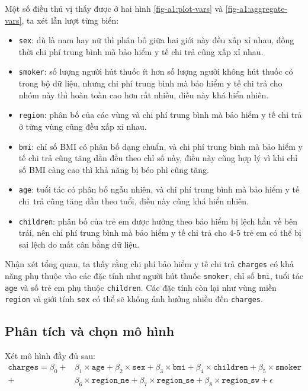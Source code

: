 Một số điều thú vị thấy được ở hai hình \ref{fig-a1:plot-vars} và \ref{fig-a1:aggregate-vars}, ta xét lần lượt từng biến:
\begin{itemize}
	\item \texttt{sex}: dù là nam hay nữ thì phân bố giữa hai giới này đều xấp xỉ nhau, đồng thời chi phí trung bình mà bảo hiểm y tế chi trả cũng xấp xỉ nhau.
	\item \texttt{smoker}: số lượng người hút thuốc ít hơn số lượng người không hút thuốc có trong bộ dữ liệu, nhưng chi phí trung bình mà bảo hiểm y tế chi trả cho nhóm này thì hoàn toàn cao hơn rất nhiều, điều này khá hiển nhiên.
	\item \texttt{region}: phân bố của các vùng và chi phí trung bình mà bảo hiểm y tế chi trả ở từng vùng cũng đều xấp xỉ nhau. 
	\item \texttt{bmi}: chỉ số BMI có phân bố dạng chuẩn, và chi phí trung bình mà bảo hiểm y tế chi trả cũng tăng dần đều theo chỉ số này, điều này cũng hợp lý vì khi chỉ số BMI càng cao thì khả năng bị béo phì cũng tăng. 
	\item \texttt{age}: tuổi tác có phân bố ngẫu nhiên, và chi phí trung bình mà bảo hiểm y tế chi~trả cũng tăng dần theo tuổi, điều này cũng khá hiển nhiên.
	\item \texttt{children}: phân bố của trẻ em được hưởng theo bảo hiểm bị lệch hẳn về bên trái, nên chi phí trung bình mà bảo hiểm y tế chi trả cho 4-5 trẻ em có thể bị sai lệch do mất cân bằng dữ liệu.
\end{itemize}

Nhận xét tổng quan, ta thấy rằng chi phí bảo hiểm y tế chi trả \texttt{charges} có khả năng phụ thuộc vào các đặc tính như người hút thuốc \texttt{smoker}, chỉ số \texttt{bmi}, tuổi tác \texttt{age} và số trẻ em phụ thuộc \texttt{children}. Các đặc tính còn lại như vùng miền \texttt{region} và giới tính \texttt{sex} có thể sẽ không ảnh hưởng nhiều đến \texttt{charges}.

\subsection*{Phân tích và chọn mô hình}

Xét mô hình đầy đủ sau:
\begin{equation}\label{a1-model-full}
	\begin{split}
		\texttt{charges} = \beta_0 + &\beta_1 \times \texttt{age} + \beta_2 \times \texttt{sex} + \beta_3 \times \texttt{bmi} + \beta_4 \times \texttt{children} + \beta_5 \times \texttt{smoker}\\ + &\beta_6 \times \texttt{region\_ne} + \beta_7 \times \texttt{region\_se} + \beta_8 \times \texttt{region\_sw} + \epsilon
	\end{split}
\end{equation}

